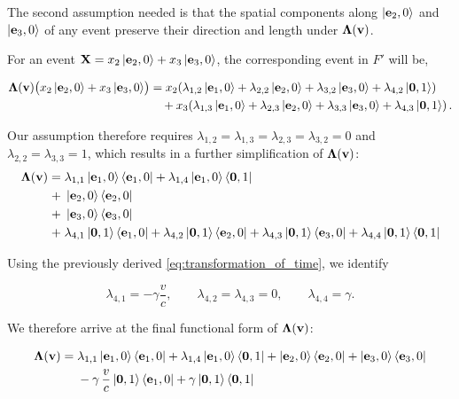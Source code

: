 \documentclass[12pt]{article}
\begin{document}
The second assumption needed is that the spatial components along $\ket{\vb{e}_2,0}$ and
$\ket{\vb{e}_3,0}$ of any event preserve their direction and length under
$\boldsymbol{\Lambda}(\vb{v})$. 

For an event $\vb{X} = x_2\ket{\vb{e}_2, 0} + x_3\ket{\vb{e}_3, 0}$, the corresponding event in $F'$ will be,

\[
  \begin{aligned}
    \boldsymbol{\Lambda}(\vb{v})
    \bigl(
      x_2\ket{\vb{e}_2,0}
      +
      x_3\ket{\vb{e}_3,0}
    \bigr)
    &=
    x_2\!\left(
        \lambda_{1,2}\ket{\vb{e}_1,0}
      + \lambda_{2,2}\ket{\vb{e}_2,0}
      + \lambda_{3,2}\ket{\vb{e}_3,0}
      + \lambda_{4,2}\ket{\vb{0},1}
    \right)
    \\
    &\quad
    +
    x_3\!\left(
        \lambda_{1,3}\ket{\vb{e}_1,0}
      + \lambda_{2,3}\ket{\vb{e}_2,0}
      + \lambda_{3,3}\ket{\vb{e}_3,0}
      + \lambda_{4,3}\ket{\vb{0},1}
    \right).
  \end{aligned}
\]

Our assumption therefore requires $\lambda_{1,2} = \lambda_{1,3} = \lambda_{2,3} = \lambda_{3,2}
= 0$ and $\lambda_{2,2} = \lambda_{3,3} = 1$, which results in a further simplification of
$\boldsymbol{\Lambda}(\vb{v})$:
\[
  \begin{aligned}
    \boldsymbol{\Lambda}(\vb{v}) =\;
      &\lambda_{1,1}\ket{\vb{e}_1,0}\bra{\vb{e}_1,0}
      + \lambda_{1,4}\ket{\vb{e}_1,0}\bra{\vb{0},1} \\
    +\;&\ket{\vb{e}_2,0}\bra{\vb{e}_2,0} \\
    +\;&\ket{\vb{e}_3,0}\bra{\vb{e}_3,0} \\
    +\;&\lambda_{4,1}\ket{\vb{0},1}\bra{\vb{e}_1,0}
      + \lambda_{4,2}\ket{\vb{0},1}\bra{\vb{e}_2,0}
      + \lambda_{4,3}\ket{\vb{0},1}\bra{\vb{e}_3,0}
      + \lambda_{4,4}\ket{\vb{0},1}\bra{\vb{0},1}
  \end{aligned}
\]

Using the previously derived  \eqref{eq:transformation_of_time}, we identify

\[
  \lambda_{4,1}=-\gamma\frac{v}{c},
  \qquad
  \lambda_{4,2}=\lambda_{4,3}=0,
  \qquad
  \lambda_{4,4}=\gamma.
\]

We therefore arrive at the final functional form of
$\boldsymbol{\Lambda}(\vb{v})$:

\begin{equation}
  \begin{aligned}
    \boldsymbol{\Lambda}(\vb{v}) =\;
      &\lambda_{1,1}\ket{\vb{e}_1,0}\bra{\vb{e}_1,0}
      + \lambda_{1,4}\ket{\vb{e}_1,0}\bra{\vb{0},1}
      + \ket{\vb{e}_2,0}\bra{\vb{e}_2,0}
      + \ket{\vb{e}_3,0}\bra{\vb{e}_3,0} \\
      &- \gamma\,\frac{v}{c}\ket{\vb{0},1}\bra{\vb{e}_1,0}
      + \gamma\ket{\vb{0},1}\bra{\vb{0},1}
  \end{aligned}
  \label{eq:simplified_Lorentz}
\end{equation}
\end{document}
